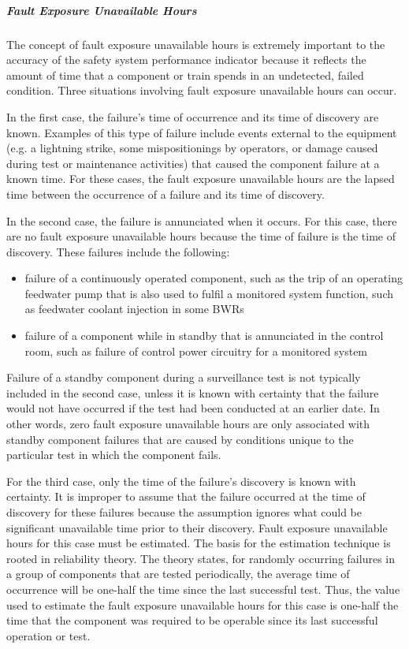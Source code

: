\subparagraph{Fault Exposure Unavailable Hours}

The concept of fault exposure unavailable hours is extremely important
to the accuracy of the safety system performance indicator because it
reflects the amount of time that a component or train spends in an
undetected, failed condition. Three situations involving fault
exposure unavailable hours can occur.

In the first case, the failure’s time of occurrence and its time of
discovery are known. Examples of this type of failure include events
external to the equipment (e.g. a lightning strike, some
mispositionings by operators, or damage caused during test or
maintenance activities) that caused the component failure at a known
time. For these cases, the fault exposure unavailable hours are the
lapsed time between the occurrence of a failure and its time of
discovery.

In the second case, the failure is annunciated when it occurs. For
this case, there are no fault exposure unavailable hours because the
time of failure is the time of discovery. These failures include the
following:
\begin{itemize}
\item failure of a continuously operated component, such as the trip of an operating feedwater pump that is also used to fulfil a monitored system function, such as feedwater coolant injection in some BWRs
\item failure of a component while in standby that is annunciated in
  the control room, such as failure of control power circuitry for a
  monitored system
\end{itemize}

Failure of a standby component during a surveillance test is not
typically included in the second case, unless it is known with
certainty that the failure would not have occurred if the test had
been conducted at an earlier date. In other words, zero fault exposure
unavailable hours are only associated with standby component failures
that are caused by conditions unique to the particular test in which
the component fails.

For the third case, only the time of the failure’s discovery is known
with certainty. It is improper to assume that the failure occurred at
the time of discovery for these failures because the assumption
ignores what could be significant unavailable time prior to their
discovery. Fault exposure unavailable hours for this case must be
estimated. The basis for the estimation technique is rooted in
reliability theory. The theory states, for randomly occurring failures
in a group of components that are tested periodically, the average
time of occurrence will be one-half the time since the last successful
test. Thus, the value used to estimate the fault exposure unavailable
hours for this case is one-half the time that the component was
required to be operable since its last successful operation or test.

